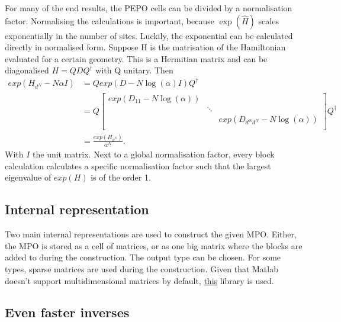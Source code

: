 For many of the end results, the PEPO cells can be divided by a normalisation factor. Normalising the calculations is important, because $\exp( \hat{H})$ scales exponentially in the number of sites. Luckily, the exponential can be calculated directly in normalised form. Suppose H is the matrisation of the Hamiltonian evaluated for a certain geometry. This is a Hermitian matrix and can be diagonalised $H= Q D Q^{\dagger}$ with Q unitary. Then
\begin{align}
    exp(  H_{d^N} - N \alpha I  ) & =  Q exp(  D- N \log(\alpha ) I    ) Q^{\dagger} \\
                                  & =  Q \begin{bmatrix} exp(D_{1 1} - N \log(\alpha )) &        &                                     \\
                                               & \ddots &                                     \\
                                               &        & exp(D_{ d^N d^N} - N \log(\alpha )) \\
    \end{bmatrix}  Q^{\dagger}      \\
                                  & = \frac{  exp(  H_{d^N} ) }{ \alpha^N }.
\end{align}
With $I$ the unit matrix. Next to a global normalisation factor, every block calculation calculates a specific normalisation factor such that the largest eigenvalue of $exp(H)$ is of the order 1.

\subsection{Internal representation}

Two main internal representations are used to construct the given MPO. Either, the MPO is stored as a cell of matrices, or as one big matrix where the blocks are added to during the construction. The output type can be chosen. For some types, sparse matrices are used during the construction. Given that Matlab doesn't support multidimensional matrices by default, \href{https://nl.mathworks.com/matlabcentral/fileexchange/29832-n-dimensional-sparse-arrays}{this}\cite{Matt} library is used.

\subsection{Even faster inverses}

